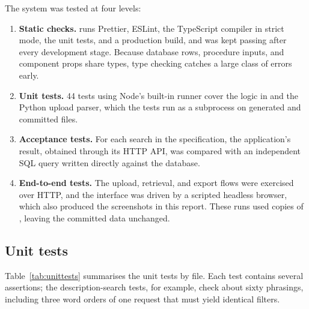 \documentclass[11pt,a4paper]{article}
\begin{document}
The system was tested at four levels:
\begin{enumerate}
  \item \textbf{Static checks.}  runs Prettier, ESLint, the TypeScript
        compiler in strict mode, the unit tests, and a production build, and was kept passing
        after every development stage. Because database rows, procedure inputs, and component
        props share types, type checking catches a large class of errors early.
  \item \textbf{Unit tests.} 44 tests using Node's built-in runner cover the logic in
         and the Python upload parser, which the tests run as a subprocess on
        generated and committed files.
  \item \textbf{Acceptance tests.} For each search in the specification, the application's
        result, obtained through its HTTP API, was compared with an independent SQL query
        written directly against the database.
  \item \textbf{End-to-end tests.} The upload, retrieval, and export flows were exercised over
        HTTP, and the interface was driven by a scripted headless browser, which also produced
        the screenshots in this report. These runs used copies of , leaving the
        committed data unchanged.
\end{enumerate}

\subsection{Unit tests}

Table~\ref{tab:unittests} summarises the unit tests by file. Each test contains several
assertions; the description-search tests, for example, check about sixty phrasings, including
three word orders of one request that must yield identical filters.
\end{document}
